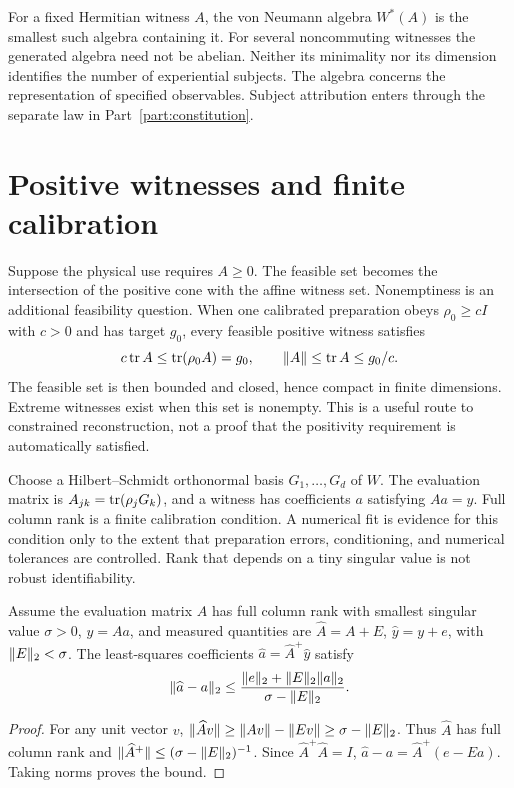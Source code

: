 For a fixed Hermitian witness $A$, the von Neumann algebra $W^*(A)$ is the smallest such algebra containing it. For several noncommuting witnesses the generated algebra need not be abelian. Neither its minimality nor its dimension identifies the number of experiential subjects. The algebra concerns the representation of specified observables. Subject attribution enters through the separate law in Part~\ref{part:constitution}.

\section{Positive witnesses and finite calibration}\label{section:src:positive-witnesses-and-finite-calibration}
Suppose the physical use requires $A\ge0$. The feasible set becomes the intersection of the positive cone with the affine witness set. Nonemptiness is an additional feasibility question. When one calibrated preparation obeys $\rho_0\ge cI$ with $c>0$ and has target $g_0$, every feasible positive witness satisfies
\[
c\operatorname{tr} A\le\operatorname{tr}(\rho_0A)=g_0,
\qquad \lVert A\rVert\le\operatorname{tr} A\le g_0/c.
\]
The feasible set is then bounded and closed, hence compact in finite dimensions. Extreme witnesses exist when this set is nonempty. This is a useful route to constrained reconstruction, not a proof that the positivity requirement is automatically satisfied.

Choose a Hilbert--Schmidt orthonormal basis $G_1,\ldots,G_d$ of $W$. The evaluation matrix is $A_{jk}=\operatorname{tr}(\rho_jG_k)$, and a witness has coefficients $a$ satisfying $Aa=y$. Full column rank is a finite calibration condition. A numerical fit is evidence for this condition only to the extent that preparation errors, conditioning, and numerical tolerances are controlled. Rank that depends on a tiny singular value is not robust identifiability.

\begin{theorem}\label{thm:robust-witness}
Assume the evaluation matrix $A$ has full column rank with smallest singular value $\sigma>0$, $y=Aa$, and measured quantities are $\widehat A=A+E$, $\widehat y=y+e$, with $\lVert E\rVert_2<\sigma$. The least-squares coefficients $\widehat a=\widehat A^+\widehat y$ satisfy
\begin{equation}\label{eq:witness-error}
\lVert \widehat a-a\rVert_2
\le\frac{\lVert e\rVert_2+\lVert E\rVert_2\lVert a\rVert_2}{\sigma-\lVert E\rVert_2}.
\end{equation}
\end{theorem}
\begin{proof}
For any unit vector $v$, $\lVert \widehat Av\rVert\ge\lVert Av\rVert-\lVert Ev\rVert\ge\sigma-\lVert E\rVert_2$. Thus $\widehat A$ has full column rank and $\lVert \widehat A^+\rVert\le(\sigma-\lVert E\rVert_2)^{-1}$. Since $\widehat A^+\widehat A=I$,
$\widehat a-a=\widehat A^+(e-Ea)$. Taking norms proves the bound.
\end{proof}

